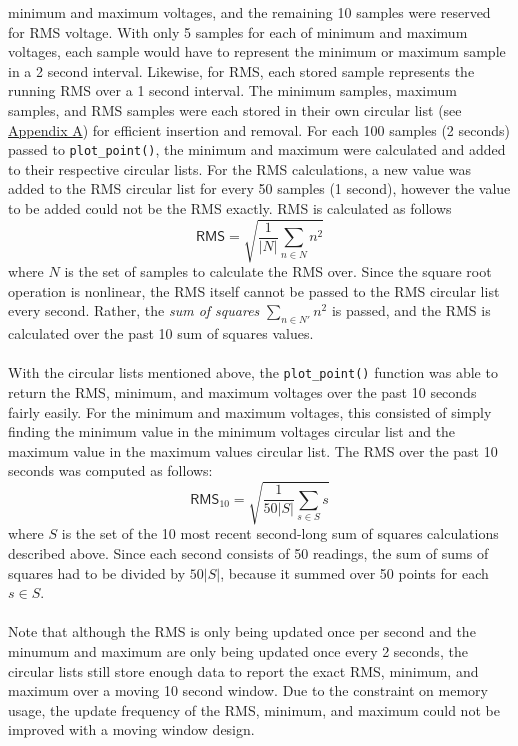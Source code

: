 \documentclass[12pt]{report}
\begin{document}
minimum and maximum voltages, and the remaining 10 samples were reserved for RMS voltage. With only
5 samples for each of minimum and maximum voltages, each sample would have to represent the minimum
or maximum sample in a 2 second interval. Likewise, for RMS, each stored sample represents the
running RMS over a 1 second interval. The minimum samples, maximum samples, and RMS samples were
each stored in their own circular list (see \hyperref[circularlists]{Appendix A}) for efficient
insertion and removal. For each 100 samples (2
seconds) passed to \texttt{plot\_point()}, the minimum and maximum were calculated and added to their
respective circular lists. For the RMS calculations, a new value was added to the RMS circular list
for every 50 samples (1 second), however the value to be added could not be the RMS exactly. RMS is
calculated as follows
\begin{equation}
	\mathsf{RMS} = \sqrt{\frac{1}{|N|}\sum_{n\in N}n^2}
\end{equation}
where $N$ is the set of samples to calculate the RMS over. Since the square root operation is
nonlinear, the RMS itself cannot be passed to the RMS circular list every second. Rather, the
\textit{sum of squares} $\sum_{n\in N'}n^2$ is passed, and the RMS is calculated over the past 10
sum of squares values.\\\\
With the circular lists mentioned above, the \texttt{plot\_point()} function was able to return the
RMS, minimum, and maximum voltages over the past 10 seconds fairly easily. For the minimum and
maximum voltages, this consisted of simply finding the minimum value in the minimum voltages circular
list and the maximum value in the maximum values circular list. The RMS over the past 10 seconds was
computed as follows:
\begin{equation}
	\mathsf{RMS}_{10} = \sqrt{\frac{1}{50|S|}\sum_{s\in S}s}
\end{equation}
where $S$ is the set of the 10 most recent second-long sum of squares calculations described above.
Since each second consists of 50 readings, the sum of sums of squares had to be divided by $50|S|$,
because it summed over 50 points for each $s\in S$.\\\\
Note that although the RMS is only being updated once per second and the minumum and maximum are
only being updated once every 2 seconds, the circular lists still store enough data to report the
exact RMS, minimum, and maximum over a moving 10 second window. Due to the constraint on memory
usage, the update frequency of the RMS, minimum, and maximum could not be improved with a moving
window design.
\end{document}
